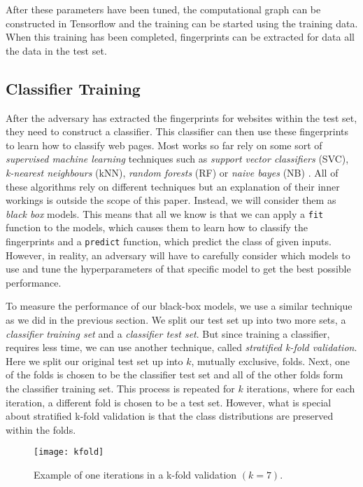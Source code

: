 After these parameters have been tuned, the computational graph can be constructed in Tensorflow and the training can be started using the training data.
When this training has been completed, fingerprints can be extracted for data all the data in the test set.

\subsection{Classifier Training} \label{sec:classifier-training}

After the adversary has extracted the fingerprints for websites within the test set, they need to construct a classifier.
This classifier can then use these fingerprints to learn how to classify web pages.
Most works so far rely on some sort of \textit{supervised machine learning} techniques such as \textit{support vector classifiers} (SVC), \textit{k-nearest neighbours} (kNN), \textit{random forests} (RF) or \textit{naive bayes} (NB) \cite{panchenko1,panchenko2,wang_cai_johnson_nithyanand_goldberg_2014,kfingerprinting,naivebayes}.
All of these algorithms rely on different techniques but an explanation of their inner workings is outside the scope of this paper.
Instead, we will consider them as \textit{black box} models.
This means that all we know is that we can apply a \texttt{fit} function to the models, which causes them to learn how to classify the fingerprints and a \texttt{predict} function, which predict the class of given inputs.
However, in reality, an adversary will have to carefully consider which models to use and tune the hyperparameters of that specific model to get the best possible performance.

To measure the performance of our black-box models, we use a similar technique as we did in the previous section.
We split our test set up into two more sets, a \textit{classifier training set} and a \textit{classifier test set}.
But since training a classifier, requires less time, we can use another technique, called \textit{stratified k-fold validation}.
Here we split our original test set up into $k$, mutually exclusive, folds.
Next, one of the folds is chosen to be the classifier test set and all of the other folds form the classifier training set.
This process is repeated for $k$ iterations, where for each iteration, a different fold is chosen to be a test set.
However, what is special about stratified k-fold validation is that the class distributions are preserved within the folds.

\begin{figure}[ht]
  \centering
  \texttt{[image: kfold]}
  \caption{Example of one iterations in a k-fold validation $(k = 7)$.}
  \label{fig:kfold}
\end{figure}

